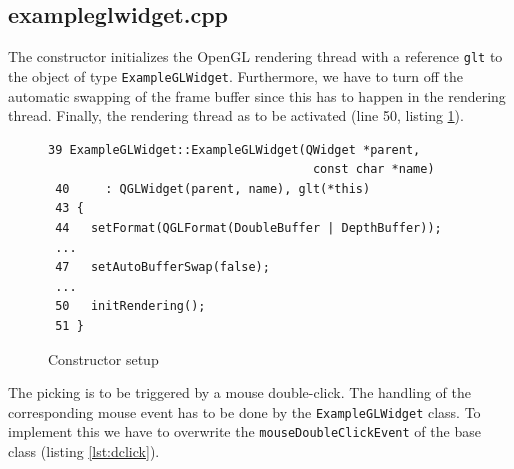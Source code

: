 \documentclass[jou,noapacite]{apa}
\begin{document}
\subsection{exampleglwidget.cpp}

The constructor initializes the OpenGL rendering thread with a
reference \lstinline|glt| to the object of type \lstinline|ExampleGLWidget|.
%
Furthermore, we have to turn off the automatic swapping of the frame buffer
since this has to happen in the rendering thread. Finally, the rendering thread
as to be activated (line 50, listing \ref{lst:ctor}).
%
\begin{figure}[h]
\begin{lstlisting}[basicstyle=\scriptsize]
 39 ExampleGLWidget::ExampleGLWidget(QWidget *parent,
                                     const char *name)
 40     : QGLWidget(parent, name), glt(*this)
 43 {
 44   setFormat(QGLFormat(DoubleBuffer | DepthBuffer));
 ...
 47   setAutoBufferSwap(false);
 ...
 50   initRendering();
 51 }
\end{lstlisting}
\caption{Constructor setup}
\label{lst:ctor}
\end{figure}

The picking is to be triggered by a mouse double-click.
%
The handling of the corresponding mouse event has to be done by
the \lstinline|ExampleGLWidget| class.
%
To implement this we have to overwrite the \lstinline|mouseDoubleClickEvent| of
the base class (listing \ref{lst:dclick}).
\end{document}
